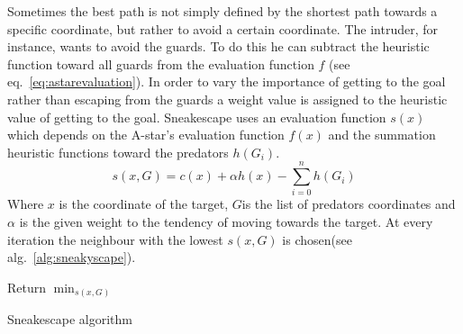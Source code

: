 Sometimes the best path is not simply defined by the shortest path towards a specific coordinate, but rather to avoid a certain coordinate. The intruder, for instance, wants to avoid the guards. To do this he can subtract the heuristic function toward all guards from the evaluation function $f$ (see eq.~\ref{eq:astarevaluation}). In order to vary the importance of getting to the goal rather than escaping from the guards a weight value is assigned to the heuristic value of getting to the goal.
			Sneakescape uses an evaluation function $s(x)$ which depends on the A-star's evaluation function $f(x)$ and the summation heuristic functions toward the predators $h(G_i)$.
			\begin{equation}
				\label{eq:sneakyscape}
			 	s(x,G) = c(x) + \alpha h(x) - \sum_{i=0}^n h(G_i)
			\end{equation} 
			Where $x$ is the coordinate of the target, $G$is the list of predators coordinates and $\alpha$ is the given weight to the tendency of moving towards the target. At every iteration the neighbour with the lowest $s(x,G)$ is chosen(see alg.~\ref{alg:sneakyscape}).
	\begin{algorithm}
	 \label{alg:sneakyscape}
				Return $\min_{s(x,G)}$ \;
				\caption{Sneakescape algorithm}
			\end{algorithm}
